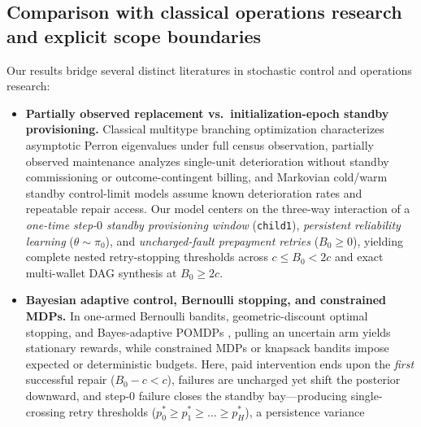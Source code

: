 \documentclass[11pt,a4paper]{article}
\providecommand{\tightlist}{\setlength{\itemsep}{2pt}\setlength{\parskip}{0pt}}
\begin{document}
\subsection{Comparison with classical operations research and explicit
scope
boundaries}\label{comparison-with-classical-operations-research-and-explicit-scope-boundaries}

Our results bridge several distinct literatures in stochastic control
and operations research:

\begin{itemize}
\tightlist
\item
  \textbf{Partially observed replacement vs.~initialization-epoch
  standby provisioning.} Classical multitype branching optimization
  \citep{harris1963, sevastyanov1971, athreyaNey1972, pliska1976, rothblumWhittle1982, gonzalez2018}
  characterizes asymptotic Perron eigenvalues under full census
  observation, partially observed maintenance
  \citep{eckles1968, ross1971, barlowProschan1975, white1979, monahan1982, makisJiang2003}
  analyzes single-unit deterioration without standby commissioning or
  outcome-contingent billing, and Markovian cold/warm standby
  control-limit models \citep{barronYechiali2017} assume known
  deterioration rates and repeatable repair access. Our model centers on
  the three-way interaction of a \emph{one-time step-\(0\) standby
  provisioning window} (\texttt{child1}), \emph{persistent reliability
  learning} (\(\theta \sim \pi_0\)), and \emph{uncharged-fault
  prepayment retries} (\(B_0 \ge 0\)), yielding complete nested
  retry-stopping thresholds across \(c \le B_0 < 2c\) and exact
  multi-wallet DAG synthesis at \(B_0 \ge 2c\).
\item
  \textbf{Bayesian adaptive control, Bernoulli stopping, and constrained
  MDPs.} In one-armed Bernoulli bandits, geometric-discount optimal
  stopping, and Bayes-adaptive POMDPs
  \citep{robbins1952, bellman1961, rieder1975, gittins1979, berryFristedt1979, whittle1982, fristedtBerry1988, easleyKiefer1988, aghion1991, duff2002, ross2011},
  pulling an uncertain arm yields stationary rewards, while constrained
  MDPs
  \citep{altman1999, feinberg2000, bauerleRieder2011, mannorTsitsiklis2013}
  or knapsack bandits \citep{besbesZeevi2009, badanidiyuru2018} impose
  expected or deterministic budgets. Here, paid intervention ends upon
  the \emph{first} successful repair (\(B_0 - c < c\)), failures are
  uncharged yet shift the posterior downward, and step-\(0\) failure
  closes the standby bay---producing single-crossing retry thresholds
  (\(p_0^* \ge p_1^* \ge \dots \ge p_H^*\)), a persistence variance

\end{itemize}
\end{document}

